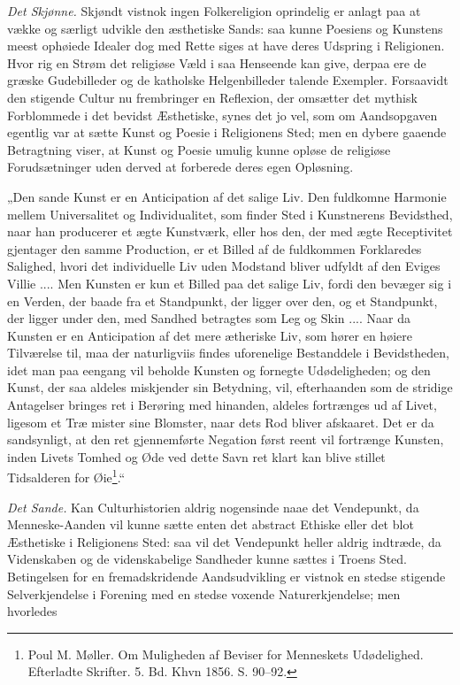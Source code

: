 \documentclass[12pt,a4paper]{book}
\begin{document}
\emph{Det Skjønne.} Skjøndt vistnok ingen Folkereligion oprindelig er anlagt paa
at vække og særligt udvikle den æsthetiske Sands: saa kunne Poesiens og Kunstens
meest ophøiede Idealer dog med Rette siges at have deres Udspring i Religionen.
Hvor rig en Strøm det religiøse Væld i saa Henseende kan give, derpaa ere de
græske Gudebilleder og de katholske Helgenbilleder talende Exempler. Forsaavidt
den stigende Cultur nu frembringer en Reflexion, der omsætter det mythisk
Forblommede i det bevidst Æsthetiske, synes det jo vel, som om Aandsopgaven
egentlig var at sætte Kunst og Poesie i Religionens Sted; men en dybere gaaende
Betragtning viser, at Kunst og Poesie umulig kunne opløse de religiøse
Forudsætninger uden derved at forberede deres egen Opløsning.

\setcounter{footnote}{0}
„Den sande Kunst er en Anticipation af det salige Liv. Den fuldkomne Harmonie
mellem Universalitet og Individualitet, som finder Sted i Kunstnerens
Bevidsthed, naar han producerer et ægte Kunstværk, eller hos den, der med ægte
Receptivitet gjentager den samme Production, er et Billed af de fuldkommen
Forklaredes Salighed, hvori det individuelle Liv uden Modstand bliver udfyldt af
den Eviges Villie .... Men Kunsten er kun et Billed paa det salige Liv, fordi
den bevæger sig i en Verden, der baade fra et Standpunkt, der ligger over den,
og et Standpunkt, der ligger under den, med Sandhed betragtes som Leg og Skin
.... Naar da Kunsten er en Anticipation af det mere ætheriske Liv, som hører en
høiere Tilværelse til, maa der naturligviis findes uforenelige Bestanddele i
Bevidstheden, idet man paa eengang vil beholde Kunsten og fornegte
Udødeligheden; og den Kunst, der saa aldeles miskjender sin Betydning, vil,
efterhaanden som de stridige Antagelser bringes ret i Berøring med hinanden,
aldeles fortrænges ud af Livet, ligesom et Træ mister sine Blomster, naar dets
Rod bliver afskaaret. Det er da sandsynligt, at den ret gjennemførte Negation
først reent vil fortrænge Kunsten, inden Livets Tomhed og Øde ved dette Savn ret
klart kan blive stillet Tidsalderen for Øie\footnote{Poul M. Møller. Om
Muligheden af Beviser for Menneskets Udødelighed. Efterladte Skrifter. 5. Bd.
Khvn 1856. S. 90--92.}.“

\emph{Det Sande.} Kan Culturhistorien aldrig nogensinde naae det Vendepunkt, da
Menneske-Aanden vil kunne sætte enten det abstract Ethiske eller det blot
Æsthetiske i Religionens Sted: saa vil det Vendepunkt heller aldrig indtræde, da
Videnskaben og de videnskabelige Sandheder kunne sættes i Troens Sted.
Betingelsen for en fremadskridende Aandsudvikling er vistnok en stedse stigende
Selverkjendelse i Forening med en stedse voxende Naturerkjendelse; men hvorledes
\end{document}

